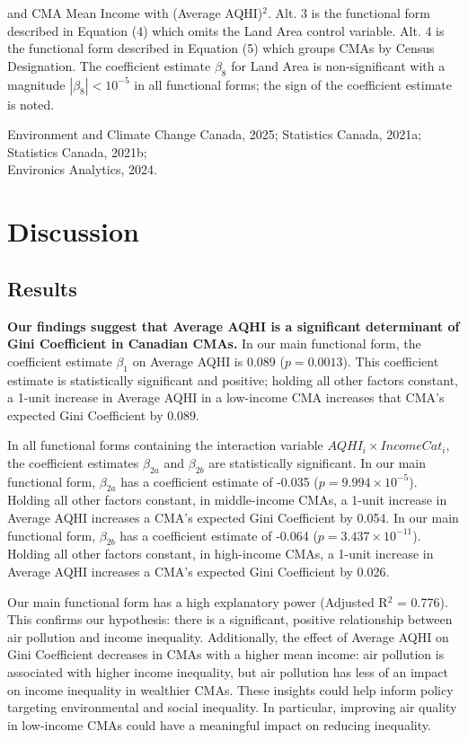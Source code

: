 \documentclass[AEJ]{AEA}
\begin{document}
\begin{table}[!htbp]
\begin{tablenotes}
and CMA Mean Income with (Average AQHI)$^2$. Alt. 3 is the functional form described
in Equation (4) which omits the Land Area control variable. Alt. 4 is the functional
form described in Equation (5) which groups CMAs by Census Designation. The coefficient estimate
$\beta_8$ for Land Area is non-significant with a magnitude $|\beta_8| < 10^{-5}$
in all functional forms; the sign of the coefficient estimate is noted.
\\
\end{tablenotes}
\begin{tablenotes}[Source]
Environment and Climate Change Canada, 2025; Statistics Canada, 2021a;
Statistics Canada, 2021b; \\Environics Analytics, 2024.
\end{tablenotes}
\end{table} 

\section{Discussion}
\subsection{Results}
\textbf{Our findings suggest that Average AQHI is a significant determinant of Gini Coefficient
in Canadian CMAs.} In our main functional form, the coefficient estimate $\beta_1$ on
Average AQHI is 0.089 ($p = 0.0013$). This coefficient estimate is statistically significant
and positive; holding all other factors constant, a 1-unit increase in Average AQHI in a
low-income CMA increases that CMA's expected Gini Coefficient by 0.089.

In all functional forms containing the interaction variable $AQHI_i \times IncomeCat_i$,
the coefficient estimates $\beta_{2a}$ and $\beta_{2b}$ are statistically significant.
In our main functional form, $\beta_{2a}$ has a coefficient estimate of -0.035
($p = 9.994 \times 10^{-5}$). Holding all other factors constant, in middle-income 
CMAs, a 1-unit increase in Average AQHI
increases a CMA's expected Gini Coefficient by 0.054. In our main functional form,
$\beta_{2b}$ has a coefficient estimate of -0.064 ($p = 3.437\times10^{-11}$). 
Holding all other factors constant, in high-income CMAs, a 1-unit increase in 
Average AQHI increases a CMA's expected Gini Coefficient by 0.026. 

Our main functional form has a high explanatory power (Adjusted R$^2$ = 0.776).
This confirms our hypothesis: there is a
significant, positive relationship between air pollution and income inequality. 
Additionally, the effect of Average AQHI on Gini Coefficient decreases in CMAs with a 
higher mean income: air pollution is associated with higher income inequality,
but air pollution has less of an impact on income inequality in wealthier CMAs.
These insights could help inform policy targeting environmental and social 
inequality. In particular, improving air quality in low-income CMAs could 
have a meaningful impact on reducing inequality.
\end{document}
